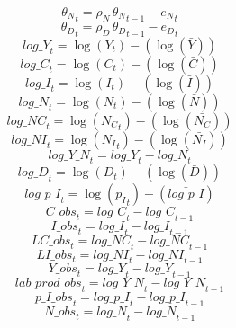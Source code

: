 \begin{dmath}
{{\theta_N}}_{t}={{\rho_N}}\, {{\theta_N}}_{t-1}-{{e_N}}_{t}
\end{dmath}
\begin{dmath}
{{\theta_D}}_{t}={{\rho_D}}\, {{\theta_D}}_{t-1}-{{e_D}}_{t}
\end{dmath}
\begin{dmath}
{log\_Y}_{t}=\log\left({{Y}}_{t}\right)-(\log\left(\bar{{Y}}\right))
\end{dmath}
\begin{dmath}
{log\_C}_{t}=\log\left({{C}}_{t}\right)-(\log\left(\bar{{C}}\right))
\end{dmath}
\begin{dmath}
{log\_I}_{t}=\log\left({{I}}_{t}\right)-(\log\left(\bar{{I}}\right))
\end{dmath}
\begin{dmath}
{log\_N}_{t}=\log\left({{N}}_{t}\right)-(\log\left(\bar{{N}}\right))
\end{dmath}
\begin{dmath}
{log\_NC}_{t}=\log\left({{N_C}}_{t}\right)-(\log\left(\bar{{N_C}}\right))
\end{dmath}
\begin{dmath}
{log\_NI}_{t}=\log\left({{N_I}}_{t}\right)-(\log\left(\bar{{N_I}}\right))
\end{dmath}
\begin{dmath}
{log\_Y\_N}_{t}={log\_Y}_{t}-{log\_N}_{t}
\end{dmath}
\begin{dmath}
{log\_D}_{t}=\log\left({{D}}_{t}\right)-(\log\left(\bar{{D}}\right))
\end{dmath}
\begin{dmath}
{log\_p\_I}_{t}=\log\left({{p_I}}_{t}\right)-(\bar{log\_p\_I})
\end{dmath}
\begin{dmath}
{C\_obs}_{t}={log\_C}_{t}-{log\_C}_{t-1}
\end{dmath}
\begin{dmath}
{I\_obs}_{t}={log\_I}_{t}-{log\_I}_{t-1}
\end{dmath}
\begin{dmath}
{LC\_obs}_{t}={log\_NC}_{t}-{log\_NC}_{t-1}
\end{dmath}
\begin{dmath}
{LI\_obs}_{t}={log\_NI}_{t}-{log\_NI}_{t-1}
\end{dmath}
\begin{dmath}
{Y\_obs}_{t}={log\_Y}_{t}-{log\_Y}_{t-1}
\end{dmath}
\begin{dmath}
{lab\_prod\_obs}_{t}={log\_Y\_N}_{t}-{log\_Y\_N}_{t-1}
\end{dmath}
\begin{dmath}
{p\_I\_obs}_{t}={log\_p\_I}_{t}-{log\_p\_I}_{t-1}
\end{dmath}
\begin{dmath}
{N\_obs}_{t}={log\_N}_{t}-{log\_N}_{t-1}
\end{dmath}
